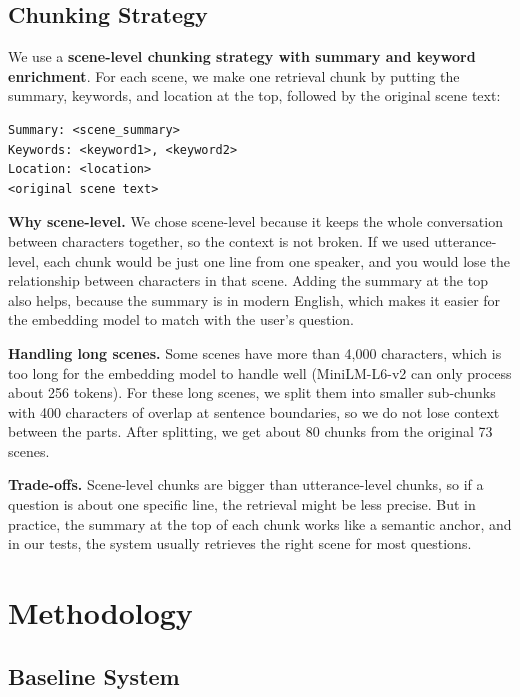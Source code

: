 \documentclass[10pt,conference]{IEEEtran}
\begin{document}
\subsection{Chunking Strategy}

We use a \textbf{scene-level chunking strategy with summary and keyword enrichment}. For each scene, we make one retrieval chunk by putting the summary, keywords, and location at the top, followed by the original scene text:

\begin{lstlisting}[language={}]
Summary: <scene_summary>
Keywords: <keyword1>, <keyword2>
Location: <location>
<original scene text>
\end{lstlisting}

\textbf{Why scene-level.} We chose scene-level because it keeps the whole conversation between characters together, so the context is not broken. If we used utterance-level, each chunk would be just one line from one speaker, and you would lose the relationship between characters in that scene. Adding the summary at the top also helps, because the summary is in modern English, which makes it easier for the embedding model to match with the user's question.

\textbf{Handling long scenes.} Some scenes have more than 4,000 characters, which is too long for the embedding model to handle well (MiniLM-L6-v2 can only process about 256 tokens). For these long scenes, we split them into smaller sub-chunks with 400 characters of overlap at sentence boundaries, so we do not lose context between the parts. After splitting, we get about 80 chunks from the original 73 scenes.

\textbf{Trade-offs.} Scene-level chunks are bigger than utterance-level chunks, so if a question is about one specific line, the retrieval might be less precise. But in practice, the summary at the top of each chunk works like a semantic anchor, and in our tests, the system usually retrieves the right scene for most questions.

\section{Methodology}
\label{sec:methodology}

\subsection{Baseline System}
\end{document}
